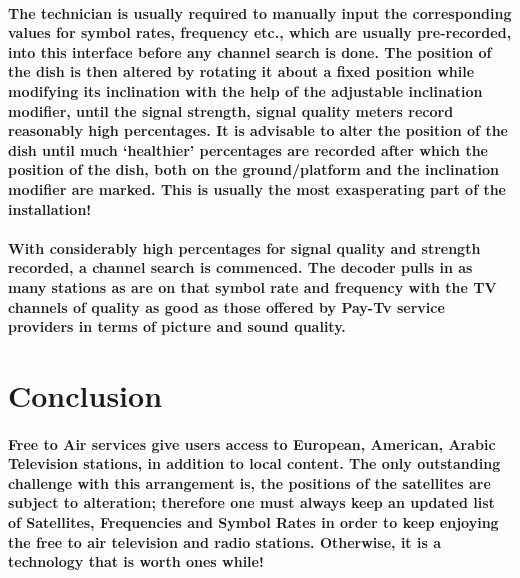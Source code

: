 \documentclass[a4paper,10pt]{report}
\begin{document}
\paragraph{The technician is usually required to manually input the corresponding values for symbol rates, frequency etc., which are usually pre-recorded, into this interface before any channel search is done.  The position of the dish is then altered by rotating it about a fixed position while modifying its inclination with the help of the adjustable inclination modifier, until the signal strength, signal quality meters record reasonably high percentages. It is advisable to alter the position of the dish until much ‘healthier’ percentages are recorded after which the position of the dish, both on the ground/platform and the inclination modifier are marked. This is usually the most exasperating part of the installation! }
\paragraph{With considerably high percentages for signal quality and strength recorded, a channel search is commenced. The decoder pulls in as many stations as are on that symbol rate and frequency with the TV channels of quality as good as those offered by Pay-Tv service providers in terms of picture and sound quality.}
\section{Conclusion}
\paragraph{Free to Air services give users access to European, American, Arabic Television stations, in addition to local content. The only outstanding challenge with this arrangement is, the positions of the satellites are subject to alteration; therefore one must always keep an updated list of Satellites, Frequencies and Symbol Rates in order to keep enjoying the free to air television and radio stations. Otherwise, it is a technology that is worth ones while!}
\end{document}
